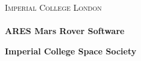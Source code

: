 \begin{titlepage}

    
    \center %
     
    
    \textsc{\huge Imperial College London}\\[0.5cm] %
    
    
    
    \HRule \\[0.4cm]
           \fontsize{35}{40}\selectfont \bfseries ARES Mars Rover Software \par %
    { \Large \bfseries Imperial College Space Society}\\[0.4cm] 
    
    \HRule \\[0.5cm]
     

\end{titlepage}
